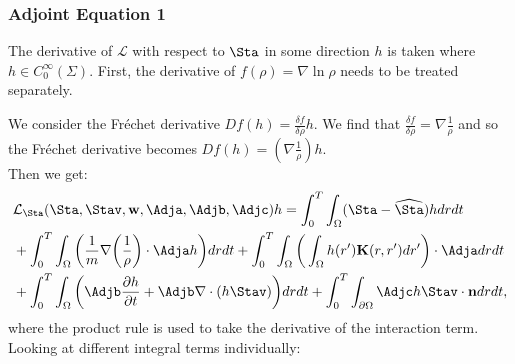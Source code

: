 \subsubsection{Adjoint Equation 1}

The derivative of $\mathcal{L}$ with respect to $\Sta$ in some direction $h$ is taken where ${h} \in C_0^\infty(\Sigma) $.
First, the derivative of $f(\rho) = \nabla \ln \rho $ needs to be treated separately. 

{\color{blue} We consider the Fr\'echet derivative $Df(h) = \frac{\delta f}{\delta \rho}h$. We find that $\frac{\delta f}{\delta \rho} = \nabla \frac{1}{\rho}$ and so the Fr\'echet derivative becomes $Df(h) = \left(\nabla \frac{1}{\rho}\right)h$. }\\
Then we get:
\begin{align*}
&\mathcal{L}_\Sta(\Sta,\Stav,\mathbf{w},\Adja,\Adjb,\Adjc)h = \int_0^T \int_\Omega  (\Sta - \widehat \Sta)h drdt \\
&+ \int_0^T \int_\Omega \bigg( \frac{1}{m}\nabla \bigg(\frac{1}{\rho}\bigg)\cdot \Adja h\bigg)  dr dt + \int_0^T \int_\Omega \bigg(\int_\Omega h(r') \mathbf{K}(r,r') dr'\bigg) \cdot \Adja dr dt\\
& + \int_0^T \int_\Omega \bigg(\Adjb\frac{\partial h}{\partial t} + \Adjb\nabla \cdot (h \Stav)\bigg)  dr dt +\int_0^T \int_{\partial\Omega} \Adjc h\Stav \cdot \mathbf{n}  dr dt,
\end{align*}
where the product rule is used to take the derivative of the interaction term.
Looking at different integral terms individually:

